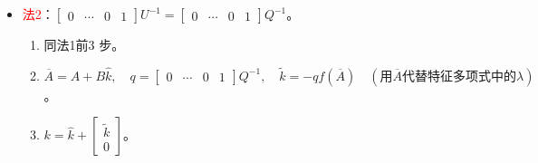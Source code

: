 \documentclass[
12pt, %
a4paper, 
oneside, %
]{scrartcl}
\begin{document}
\begin{itemize}
\begin{enumerate}
\begin{enumerate}
\end{enumerate}
\item 求状态反馈$ S $使单输入完全能控$ \hat{\Sigma}_S(\hat{A} + \hat{B}S, \hat{B}) $。
\item 返回原系统，得到反馈$ \hat{k} = S Q^{-1} $使单输入完全能控$ \Sigma_{\hat{k}}(A + B \hat{k}, B) $。
\item 为单输入配置极点：
\begin{enumerate}
\item $ \overline{A} = A + B \hat{k}, \quad |sI - \overline{A}| = s^n + a_{n - 1} s^{n - 1} + \dots + a_1 s + a_0 $。
\item 目标：$ (s - \lambda_1) \cdots (s - \lambda_m) = s^n + \alpha_{n - 1} s^{n - 1} + \dots + \alpha_1 s + \alpha_0 $。
\item $ k = \begin{bmatrix} a_0 - \alpha_0 & \cdots & a_{n - 1} - \alpha_{n - 1} \end{bmatrix} $。
\end{enumerate}
\item 还原：
\begin{enumerate}
\item $ {\scriptsize \overline{U} = \begin{bmatrix} B_1 & \overline{A} B_1 & \cdots & \overline{A}^{n - 1} B_1 \end{bmatrix}, \quad q = \begin{bmatrix} 0 & \cdots & 0 & 1 \end{bmatrix} \overline{U}^{-1}, \quad T^{-1} = \begin{bmatrix} q^T & (q \overline{A})^T & \cdots & (q \overline{A}^{n - 1})^T \end{bmatrix}^T} $。
\item $ \widetilde{k} = k T^{-1}, \quad k = \hat{k} + \begin{bmatrix} \widetilde{k} \\ 0 \end{bmatrix} $。
\end{enumerate}
\end{enumerate}
\item \textcolor{red}{法2}：$ \begin{bmatrix} 0 & \cdots & 0 & 1 \end{bmatrix} U^{-1} = \begin{bmatrix} 0 & \cdots & 0 & 1 \end{bmatrix} Q^{-1} $。
\begin{enumerate}
\item 同法1前3 步。
\item $ \overline{A} = A + B \hat{k}, \quad q = \begin{bmatrix} 0 & \cdots & 0 & 1 \end{bmatrix} Q^{-1}, \quad \widetilde{k} = -q f(\overline{A}) \quad (\text{用}\overline{A}\text{代替特征多项式中的}\lambda) $。
\item $ k = \hat{k} + \begin{bmatrix} \widetilde{k} \\ 0 \end{bmatrix} $。
\end{enumerate}
\end{itemize}
\end{document}
